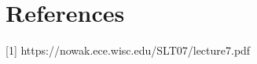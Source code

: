 \documentclass[11pt]{article}
\begin{document}
\section{References}
[1] https://nowak.ece.wisc.edu/SLT07/lecture7.pdf

\end{document}
